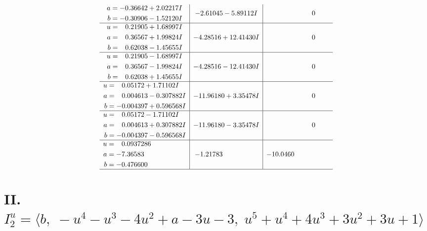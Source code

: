 \documentclass[1p]{elsarticle_modified}
\theoremstyle{definition}
\begin{document}
$$\begin{array}{c|c|c}
\begin{aligned}
a &= -0.36642 + 2.02217 I \\
b &= -0.30906 - 1.52120 I\end{aligned}
 & -2.61045 - 5.89112 I & \phantom{-0.000000 } 0 \\ \hline\begin{aligned}
u &= \phantom{-}0.21905 + 1.68997 I \\
a &= \phantom{-}0.36567 + 1.99824 I \\
b &= \phantom{-}0.62038 - 1.45655 I\end{aligned}
 & -4.28516 + 12.41430 I & \phantom{-0.000000 } 0 \\ \hline\begin{aligned}
u &= \phantom{-}0.21905 - 1.68997 I \\
a &= \phantom{-}0.36567 - 1.99824 I \\
b &= \phantom{-}0.62038 + 1.45655 I\end{aligned}
 & -4.28516 - 12.41430 I & \phantom{-0.000000 } 0 \\ \hline\begin{aligned}
u &= \phantom{-}0.05172 + 1.71102 I \\
a &= \phantom{-}0.004613 - 0.307882 I \\
b &= -0.004397 + 0.596568 I\end{aligned}
 & -11.96180 + 3.35478 I & \phantom{-0.000000 } 0 \\ \hline\begin{aligned}
u &= \phantom{-}0.05172 - 1.71102 I \\
a &= \phantom{-}0.004613 + 0.307882 I \\
b &= -0.004397 - 0.596568 I\end{aligned}
 & -11.96180 - 3.35478 I & \phantom{-0.000000 } 0 \\ \hline\begin{aligned}
u &= \phantom{-}0.0937286\phantom{ +0.000000I} \\
a &= -7.36583\phantom{ +0.000000I} \\
b &= -0.476600\phantom{ +0.000000I}\end{aligned}
 & -1.21783\phantom{ +0.000000I} & -10.0460\phantom{ +0.000000I}\\
 \hline 
 \end{array}$$\newpage\newpage\renewcommand{\arraystretch}{1}
\centering \section*{II. $I^u_{2}= \langle b,\;- u^4- u^3-4 u^2+a-3 u-3,\;u^5+u^4+4 u^3+3 u^2+3 u+1 \rangle$}
\end{document}
